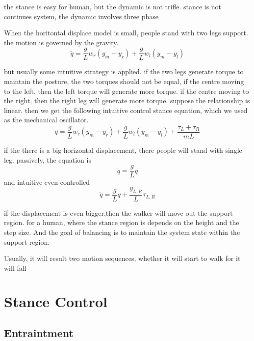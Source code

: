 the stance is easy for human, but the dynamic is not trifle.
stance is not continues system, the dynamic involves three phase

\begin{itemize}
When the horitontal displace model is small, people stand with two legs support.
the motion is governed by the gravity.
\[
\ddot{q}=\frac{g}{L}w_r(y_m-y_r)+\frac{g}{L}w_l(y_m-y_l)
\]


but usually some intuitive strategy is applied.
if the two legs generate torque to maintain the posture, the two torques should not be equal,
if the centre moving to the left, then the left torque will generate more torque.
if the centre moving to the right, then the right leg will generate more torque.
suppose the relationship is linear.
then we get the following intuitive control stance equation, which we used as the mechanical oscillator.
\begin{equation}
\label{eq:stanceequation}
\ddot{q}=\frac{g}{L}w_r(y_m-y_r)+\frac{g}{L}w_l(y_m-y_l)+\frac{\tau_L+\tau_R}{mL}
\end{equation}



if the there is a big horizontal displacement, there people will stand with single leg.
passively, the equation is 
\[
\ddot{q}=\frac{g}{L}q
\]
and intuitive even controlled
\begin{equation}
\label{equ:singlestand}
\ddot{q}=\frac{g}{L}q+\frac{y_{L,R}}{L}\tau_{L,R}
\end{equation}

if the displacement is even bigger,then the walker will move out the support region.
for a human, where the stance region is depends on the  height and the step size.
And the goal of balancing is to maintain the system state within the support region.

Usually, it will result two motion sequences, whether it will start to walk for it will fall


\end{itemize}

\section {Stance Control}
\subsection{Entraintment}

